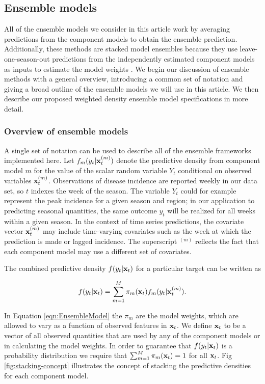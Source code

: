 \documentclass[10pt,letterpaper]{article}
\begin{document}
\subsection{Ensemble models}\label{ensemble-models}

All of the ensemble models we consider in this article work by averaging
predictions from the component models to obtain the ensemble prediction.
Additionally, these methods are stacked model ensembles because they use
leave-one-season-out predictions from the independently estimated
component models as inputs to estimate the model weights
\cite{Wolpert1992}. We begin our discussion of ensemble methods with a
general overview, introducing a common set of notation and giving a
broad outline of the ensemble models we will use in this article. We
then describe our proposed weighted density ensemble model
specifications in more detail.

\subsubsection{Overview of ensemble
models}\label{overview-of-ensemble-models}

A single set of notation can be used to describe all of the ensemble
frameworks implemented here. Let \(f_m(y_t|{\bf x}_t^{(m)})\) denote the
predictive density from component model \(m\) for the value of the
scalar random variable \(Y_t\) conditional on observed variables
\({\bf x}_t^{(m)}\). Observations of disease incidence are reported weekly
in our data set, so \(t\) indexes the week of the season. The variable
\(Y_t\) could for example represent the peak incidence for a given
season and region; in our application to predicting seasonal quantities,
the same outcome \(y_t\) will be realized for all weeks within a given
season. In the context of time series predictions, the covariate vector
\({\bf x}_t^{(m)}\) may include time-varying covariates such as the week at
which the prediction is made or lagged incidence. The superscript
\(^{(m)}\) reflects the fact that each component model may use a
different set of covariates.

The combined predictive density \(f(y_t|{\bf x}_t)\) for a particular target
can be written as

\begin{equation}
f(y_t|{\bf x}_t) = \sum_{m = 1}^M \pi_m({\bf x}_t) f_m(y_t|{\bf x}_t^{(m)}). \label{eqn:EnsembleModel} 
\end{equation}

In Equation \eqref{eqn:EnsembleModel} the \(\pi_m\) are the model
weights, which are allowed to vary as a function of observed features in
\({\bf x}_t\). We define \({\bf x}_t\) to be a vector of all observed quantities
that are used by any of the component models or in calculating the model
weights. In order to guarantee that \(f(y_t|{\bf x}_t)\) is a probability
distribution we require that \(\sum_{m = 1}^M \pi_m({\bf x}_t) = 1\) for all
\({\bf x}_t\). Fig \ref{fig:stacking-concept} illustrates the concept of
stacking the predictive densities for each component model.
\end{document}
